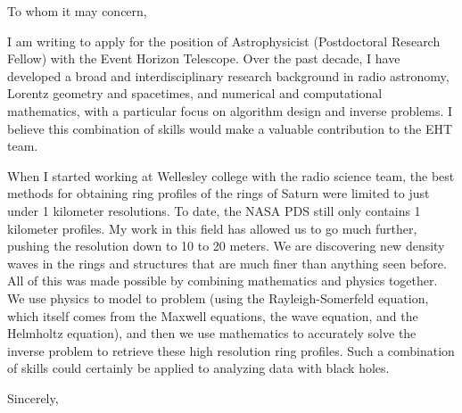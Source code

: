 \documentclass{letter}
\begin{document}
    \begin{letter}{}
        \opening{To whom it may concern,}
            I am writing to apply for the position of Astrophysicist
            (Postdoctoral Research Fellow) with the Event Horizon Telescope.
            Over the past decade, I have developed a broad and
            interdisciplinary research background in radio astronomy, Lorentz
            geometry and spacetimes, and numerical and computational
            mathematics, with a particular focus on algorithm design and
            inverse problems. I believe this combination of skills would
            make a valuable contribution to the EHT team.
            \par
            When I started working at Wellesley college with the radio science
            team, the best methods for obtaining ring profiles of the rings of
            Saturn were limited to just under 1 kilometer resolutions.
            To date, the NASA PDS still only contains 1 kilometer profiles.
            My work in this
            field has allowed us to go much further, pushing the resolution
            down to 10 to 20 meters. We are discovering new density waves in
            the rings and structures that are much finer than anything seen before.
            All of this was made possible by combining mathematics and physics
            together. We use physics to model to problem
            (using the Rayleigh-Somerfeld equation,
            which itself comes from the Maxwell equations, the wave equation, and
            the Helmholtz equation), and then we use mathematics to accurately
            solve the inverse problem to retrieve these high resolution ring
            profiles. Such a combination of skills could certainly be applied
            to analyzing data with black holes.
        \closing{Sincerely,}
    \end{letter}
\end{document}
